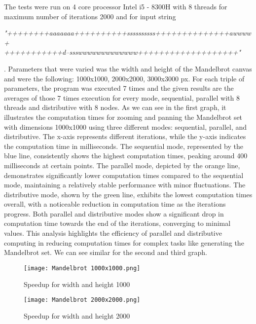 \documentclass[sigconf]{acmart}
\begin{document}
The tests were run on 4 core processor Intel i5 - 8300H with 8 threads for maximum number of iterations 2000 and for input string
\begin{minipage}[t]{\columnwidth}
\textit{"++++++++aaaaaaa++++++++++ssssssssss++++++++++++++awwww+
\\+++++++++++d--ssswwwwwwwwwwwww+++++++++++++++++++"}
\end{minipage}. Parameters that were varied was the width and height of the Mandelbrot canvas and were the following: 1000x1000, 2000x2000, 3000x3000 px. For each triple of parameters, the program was executed 7 times and the given results are the averages of those 7 times execution for every mode, sequential, parallel with 8 threads and distributive with 8 nodes. As we can see in the first graph, it illustrates the computation times for zooming and panning the Mandelbrot set with dimensions 1000x1000 using three different modes: sequential, parallel, and distributive. The x-axis represents different iterations, while the y-axis indicates the computation time in milliseconds. The sequential mode, represented by the blue line, consistently shows the highest computation times, peaking around 400 milliseconds at certain points. The parallel mode, depicted by the orange line, demonstrates significantly lower computation times compared to the sequential mode, maintaining a relatively stable performance with minor fluctuations. The distributive mode, shown by the green line, exhibits the lowest computation times overall, with a noticeable reduction in computation time as the iterations progress. Both parallel and distributive modes show a significant drop in computation time towards the end of the iterations, converging to minimal values. This analysis highlights the efficiency of parallel and distributive computing in reducing computation times for complex tasks like generating the Mandelbrot set. We can see similar for the second and third graph.

\begin{figure}[H]
    \centering
    \texttt{[image: Mandelbrot 1000x1000.png]} %
    \caption{Speedup for width and height 1000}
    \label{fig:1000}
\end{figure}

\begin{figure}[H]
    \centering
    \texttt{[image: Mandelbrot 2000x2000.png]} %
    \caption{Speedup for width and height 2000}
    \label{fig:2000}
\end{figure}
\end{document}
